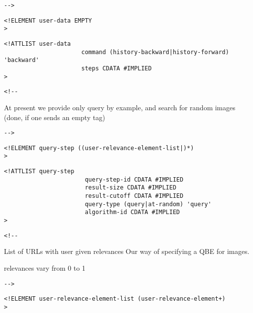  \begin{verbatim}-->\end{verbatim}



\begin{verbatim}
<!ELEMENT user-data EMPTY 
>\end{verbatim}

\begin{verbatim}
<!ATTLIST user-data 
                      command (history-backward|history-forward) 'backward'
                      steps CDATA #IMPLIED
>\end{verbatim}

\begin{verbatim}<!--\end{verbatim}
  


     At present we provide only query by example, and search for random
     images (done, if one sends an empty  tag)


       
 \begin{verbatim}-->\end{verbatim}



\begin{verbatim}
<!ELEMENT query-step ((user-relevance-element-list|)*) 
>\end{verbatim}

\begin{verbatim}
<!ATTLIST query-step 
                       query-step-id CDATA #IMPLIED
                       result-size CDATA #IMPLIED
                       result-cutoff CDATA #IMPLIED
                       query-type (query|at-random) 'query'
                       algorithm-id CDATA #IMPLIED
>\end{verbatim}

\begin{verbatim}<!--\end{verbatim}

     List of URLs with user given relevances 
     Our way of specifying a QBE for images.

     relevances vary from 0 to 1
      
 \begin{verbatim}-->\end{verbatim}



\begin{verbatim}
<!ELEMENT user-relevance-element-list (user-relevance-element+) 
>\end{verbatim}

